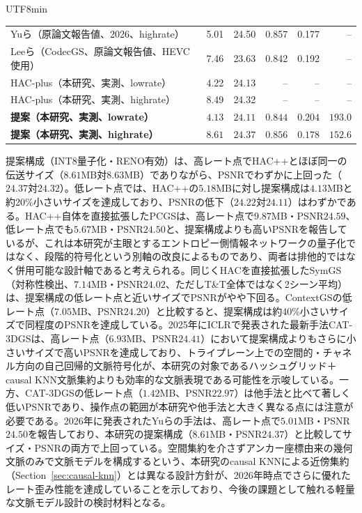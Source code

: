 \documentclass{ieeeaccess}
\begin{document}
\begin{CJK}{UTF8}{min}
\begin{table}[!t]
\begin{tabular}{p{5.2cm}rrrrr}
Yuら\cite{yu2026practical}（原論文報告値、2026、highrate） & 5.01 & 24.50 & 0.857 & 0.177 & -- \\
Leeら\cite{lee2025codecgs}（CodecGS、原論文報告値、HEVC使用） & 7.46 & 23.63 & 0.842 & 0.192 & -- \\
\midrule
HAC-plus（本研究、実測、lowrate） & 4.22 & 24.13 & -- & -- & -- \\
HAC-plus（本研究、実測、highrate） & 8.49 & 24.32 & -- & -- & -- \\
\textbf{提案（本研究、実測、lowrate）} & $\mathbf{4.13}$ & $\mathbf{24.11}$ & $\mathbf{0.844}$ & $\mathbf{0.204}$ & $\mathbf{193.0}$ \\
\textbf{提案（本研究、実測、highrate）} & $\mathbf{8.61}$ & $\mathbf{24.37}$ & $\mathbf{0.856}$ & $\mathbf{0.178}$ & $\mathbf{152.6}$ \\
\bottomrule
\end{tabular}
\end{table}

提案構成（INT8量子化・RENO有効）は、高レート点でHAC++とほぼ同一の伝送サイズ（$8.61$MB対$8.63$MB）でありながら、PSNRでわずかに上回った（$24.37$対$24.32$）。低レート点では、HAC++の$5.18$MBに対し提案構成は$4.13$MBと約20\%小さいサイズを達成しており、PSNRの低下（$24.22$対$24.11$）はわずかである。HAC++自体を直接拡張したPCGSは、高レート点で$9.87$MB・PSNR$24.59$、低レート点でも$5.67$MB・PSNR$24.50$と、提案構成よりも高いPSNRを報告しているが、これは本研究が主眼とするエントロピー側情報ネットワークの量子化ではなく、段階的符号化という別軸の改良によるものであり、両者は排他的ではなく併用可能な設計軸であると考えられる。同じくHACを直接拡張したSymGS（対称性検出、$7.14$MB・PSNR$24.02$、ただしT\&T全体ではなく2シーン平均）は、提案構成の低レート点と近いサイズでPSNRがやや下回る。ContextGSの低レート点（$7.05$MB、PSNR$24.20$）と比較すると、提案構成は約40\%小さいサイズで同程度のPSNRを達成している。2025年にICLRで発表された最新手法CAT-3DGSは、高レート点（$6.93$MB、PSNR$24.41$）において提案構成よりもさらに小さいサイズで高いPSNRを達成しており、トライプレーン上での空間的・チャネル方向の自己回帰的文脈符号化が、本研究の対象であるハッシュグリッド＋causal KNN文脈集約よりも効率的な文脈表現である可能性を示唆している。一方、CAT-3DGSの低レート点（$1.42$MB、PSNR$22.97$）は他手法と比べて著しく低いPSNRであり、操作点の範囲が本研究や他手法と大きく異なる点には注意が必要である。2026年に発表されたYuらの手法は、高レート点で$5.01$MB・PSNR$24.50$を報告しており、本研究の提案構成（$8.61$MB・PSNR$24.37$）と比較してサイズ・PSNRの両方で上回っている。空間集約を介さずアンカー座標由来の幾何文脈のみで文脈モデルを構成するという、本研究のcausal KNNによる近傍集約（Section~\ref{sec:causal-knn}）とは異なる設計方針が、2026年時点でさらに優れたレート歪み性能を達成していることを示しており、今後の課題として触れる軽量な文脈モデル設計の検討材料となる。


\end{CJK}
\end{document}
